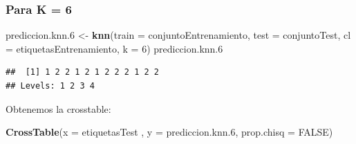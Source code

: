 \documentclass[]{article}
\newenvironment{Shaded}{\begin{snugshade}}{\end{snugshade}}
\newcommand{\KeywordTok}[1]{\textcolor[rgb]{0.13,0.29,0.53}{\textbf{#1}}}
\newcommand{\DataTypeTok}[1]{\textcolor[rgb]{0.13,0.29,0.53}{#1}}
\newcommand{\DecValTok}[1]{\textcolor[rgb]{0.00,0.00,0.81}{#1}}
\newcommand{\StringTok}[1]{\textcolor[rgb]{0.31,0.60,0.02}{#1}}
\newcommand{\OtherTok}[1]{\textcolor[rgb]{0.56,0.35,0.01}{#1}}
\newcommand{\NormalTok}[1]{#1}
\begin{document}
\subsubsection{Para K = 6}\label{para-k-6}

\begin{Shaded}
\begin{Highlighting}[]
\NormalTok{prediccion.knn.}\DecValTok{6}\NormalTok{ <-}\StringTok{ }\KeywordTok{knn}\NormalTok{(}\DataTypeTok{train =}\NormalTok{ conjuntoEntrenamiento, }\DataTypeTok{test =}\NormalTok{ conjuntoTest, }\DataTypeTok{cl =}\NormalTok{ etiquetasEntrenamiento, }\DataTypeTok{k =} \DecValTok{6}\NormalTok{)}
\NormalTok{prediccion.knn.}\DecValTok{6}
\end{Highlighting}
\end{Shaded}

\begin{verbatim}
##  [1] 1 2 2 1 2 1 2 2 2 1 2 2
## Levels: 1 2 3 4
\end{verbatim}

Obtenemos la crosstable:

\begin{Shaded}
\begin{Highlighting}[]
\KeywordTok{CrossTable}\NormalTok{(}\DataTypeTok{x =}\NormalTok{ etiquetasTest , }\DataTypeTok{y =}\NormalTok{ prediccion.knn.}\DecValTok{6}\NormalTok{, }\DataTypeTok{prop.chisq =} \OtherTok{FALSE}\NormalTok{)}
\end{Highlighting}
\end{Shaded}
\end{document}
